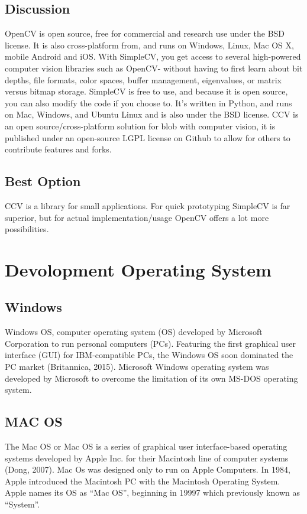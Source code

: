 \documentclass{scrreprt}
\begin{document}
\subsection{Discussion}
OpenCV is open source, free for commercial and research use under the BSD license.
It is also cross-platform from, and runs on Windows, Linux, Mac OS X, mobile Android and iOS. With SimpleCV, you get access to several high-powered computer vision libraries such as OpenCV- without having to first learn about bit depths, file formats, color spaces, buffer management, eigenvalues, or matrix versus bitmap storage.
SimpleCV is free to use, and because it is open source, you can also modify the code if you choose to.
It’s written in Python, and runs on Mac, Windows, and Ubuntu Linux and is also under the BSD license.
CCV is an open source/cross-platform solution for blob with computer vision,
it is published under an open-source LGPL license on Github to allow for others to contribute features and forks.


\subsection{Best Option}
CCV is a library for small applications.
For quick prototyping SimpleCV is far superior, but for actual implementation/usage OpenCV offers a lot more possibilities.

\section{Devolopment Operating System}

\subsection{Windows}
Windows OS, computer operating system (OS) developed by Microsoft Corporation to run personal
computers (PCs). Featuring the first graphical user interface (GUI) for IBM-compatible PCs, the Windows
OS soon dominated the PC market (Britannica, 2015). Microsoft Windows operating system was
developed by Microsoft to overcome the limitation of its own MS-DOS operating system.

\subsection{MAC OS}
The Mac OS or Mac OS is a series of graphical user interface-based operating systems developed by
Apple Inc. for their Macintosh line of computer systems (Dong, 2007). Mac Os was designed only to run
on Apple Computers. In 1984, Apple introduced the Macintosh PC with the Macintosh Operating
System. Apple names its OS as “Mac OS”, beginning in 19997 which previously known as “System”.
\end{document}
